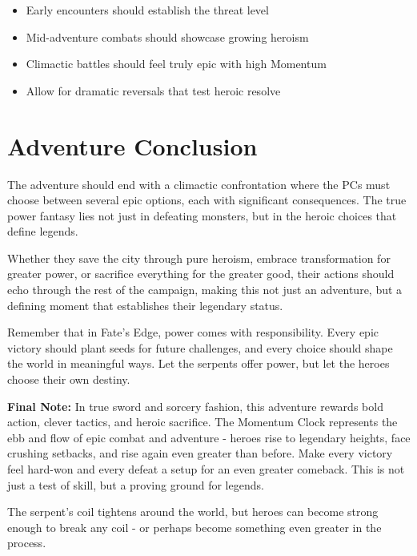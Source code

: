 \documentclass[12pt,twoside]{article}
\begin{document}
\begin{itemize}
  \item Early encounters should establish the threat level
  \item Mid-adventure combats should showcase growing heroism
  \item Climactic battles should feel truly epic with high Momentum
  \item Allow for dramatic reversals that test heroic resolve
\end{itemize}

\section{Adventure Conclusion}

The adventure should end with a climactic confrontation where the PCs must choose between several epic options, each with significant consequences. The true power fantasy lies not just in defeating monsters, but in the heroic choices that define legends.

Whether they save the city through pure heroism, embrace transformation for greater power, or sacrifice everything for the greater good, their actions should echo through the rest of the campaign, making this not just an adventure, but a defining moment that establishes their legendary status.

Remember that in Fate's Edge, power comes with responsibility. Every epic victory should plant seeds for future challenges, and every choice should shape the world in meaningful ways. Let the serpents offer power, but let the heroes choose their own destiny.

\textbf{Final Note:}
In true sword and sorcery fashion, this adventure rewards bold action, clever tactics, and heroic sacrifice. The Momentum Clock represents the ebb and flow of epic combat and adventure - heroes rise to legendary heights, face crushing setbacks, and rise again even greater than before. Make every victory feel hard-won and every defeat a setup for an even greater comeback. This is not just a test of skill, but a proving ground for legends.

The serpent's coil tightens around the world, but heroes can become strong enough to break any coil - or perhaps become something even greater in the process.
\end{document}
